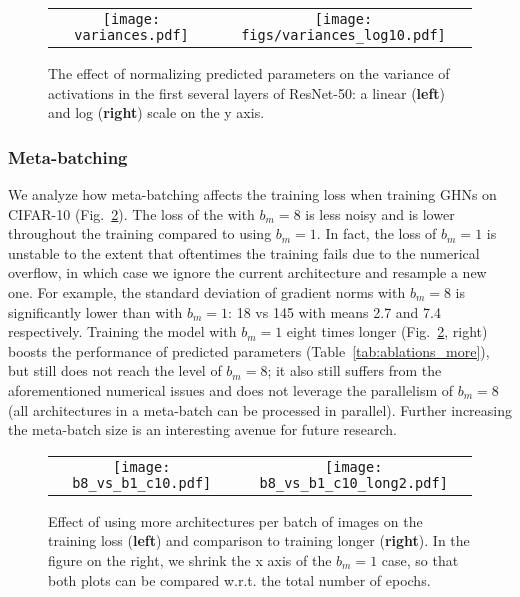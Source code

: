 \begin{figure}[tbhp]
	\vspace{-1pt}
	\centering
	\setlength{\tabcolsep}{10pt}
	\begin{tabular}{cc}
		\texttt{[image: variances.pdf]} & \texttt{[image: figs/variances\_log10.pdf]}
	\end{tabular}
	\vspace{-5pt}
	\caption{The effect of normalizing predicted parameters on the variance of activations in the first several layers of ResNet-50: a linear (\textbf{left}) and log (\textbf{right}) scale on the y axis. }
	\label{fig:activations}
	\vspace{-1pt}
\end{figure}

\subsubsection{Meta-batching\label{apdx:meta}}
We analyze how meta-batching affects the training loss when training GHNs on CIFAR-10 (Fig.~\ref{fig:meta_batch}). The loss of the \ghnours with $b_m=8$ is less noisy and is lower throughout the training compared to using $b_m=1$. In fact, the loss of $b_m=1$ is unstable to the extent that oftentimes the training fails due to the numerical overflow, in which case we ignore the current architecture and resample a new one.
For example, the standard deviation of gradient norms with $b_m=8$ is significantly lower than with $b_m=1$: 18 vs 145 with means 2.7 and 7.4 respectively.
Training the model with $b_m=1$ eight times longer (Fig.~\ref{fig:meta_batch}, right) boosts the performance of predicted parameters (Table~\ref{tab:ablations_more}), but still does not reach the level of $b_m=8$; it also still suffers from the aforementioned numerical issues and does not leverage the parallelism of $b_m=8$ (all architectures in a meta-batch can be processed in parallel). 
Further increasing the meta-batch size is an interesting avenue for future research.

\begin{figure}[tbhp]
	\vspace{-1pt}
	\centering
	\setlength{\tabcolsep}{10pt}
	\begin{tabular}{cc}
		\texttt{[image: b8\_vs\_b1\_c10.pdf]} & \texttt{[image: b8\_vs\_b1\_c10\_long2.pdf]}\\
	\end{tabular}
	\vspace{-5pt}
	\caption{Effect of using more architectures per batch of images on the training loss (\textbf{left}) and comparison to training longer (\textbf{right}). In the figure on the right, we shrink the x axis of the $b_m=1$ case, so that both plots can be compared w.r.t. the total number of epochs.   }
	\label{fig:meta_batch}
	\vspace{-1pt}
\end{figure}

